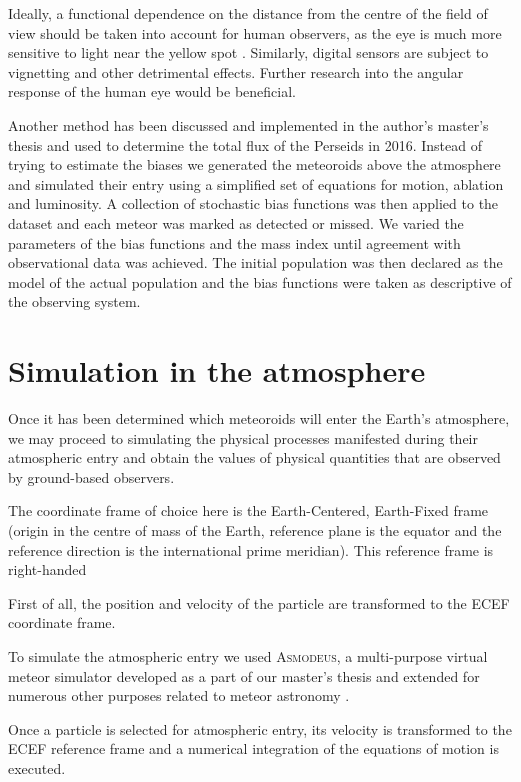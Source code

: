            Ideally, a functional dependence on the distance from the centre of the field
            of view should be taken into account for human observers, as the eye is much more
            sensitive to light near the yellow spot .
            Similarly, digital sensors are subject to vignetting and other detrimental effects.
            Further research into the angular response of the human eye would be beneficial.

    Another method has been discussed and implemented in the author's master's thesis \citep{balaz-thesis}
    and used to determine the total flux of the Perseids in 2016. Instead of trying to
    estimate the biases we generated the meteoroids above the atmosphere and simulated
    their entry using a simplified set of equations for motion, ablation and luminosity.
    A collection of stochastic bias functions was then applied to the dataset and
    each meteor was marked as detected or missed. We varied the parameters of the bias functions
    and the mass index until agreement with observational data was achieved.
    The initial population was then declared as the model of the actual population
    and the bias functions were taken as descriptive of the observing system.


\section{Simulation in the atmosphere} \label{ma}
    Once it has been determined which meteoroids will enter the Earth's atmosphere, we may proceed to simulating
    the physical processes manifested during their atmospheric entry and obtain the values of physical quantities
    that are observed by ground-based observers.

    The coordinate frame of choice here is the Earth-Centered, Earth-Fixed frame (origin in the centre of mass of the Earth,
    reference plane is the equator and the reference direction is the international prime meridian).
    This reference frame is right-handed

    First of all, the position and velocity of the particle are transformed to the ECEF coordinate frame.

    To simulate the atmospheric entry we used \textsc{Asmodeus},
    a multi-purpose virtual meteor simulator developed as a part of our master's thesis and extended for numerous
    other purposes related to meteor astronomy \citep{balaz-thesis,balaz+2020}.

    Once a particle is selected for atmospheric entry, its velocity is transformed to the ECEF reference frame
    and a numerical integration of the equations of motion is executed.

